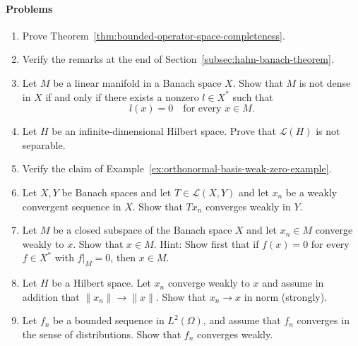 \paragraph*{Problems}

\begin{enumerate}[label=\thesection.\arabic*.,ref=\thesection.\arabic*,start=24,series=book-problems]

\item\label{ex:bounded-operator-space-completeness} Prove Theorem~\ref{thm:bounded-operator-space-completeness}.

\item\label{ex:hahn-banach-hilbert-extension-details} Verify the remarks at the end of Section~\ref{subsec:hahn-banach-theorem}.

\item\label{ex:nondense-linear-manifold-annihilating-functional} Let $M$ be a linear manifold in a Banach space $X$. Show that $M$ is not dense in $X$ if and only if there exists a nonzero $l\in X^*$ such that\[l(x)=0\quad\text{for every }x\in M.\]

\item\label{ex:infinite-hilbert-operator-space-nonseparable} Let $H$ be an infinite-dimensional Hilbert space. Prove that $\mathcal{L}(H)$ is not separable.

\item\label{ex:orthonormal-basis-weak-zero} Verify the claim of Example~\ref{ex:orthonormal-basis-weak-zero-example}.

\item\label{ex:bounded-linear-map-weak-continuity} Let $X,Y$ be Banach spaces and let $T\in\mathcal{L}(X,Y)$ and let $x_n$ be a weakly convergent sequence in $X$. Show that $Tx_n$ converges weakly in $Y$.

\item\label{ex:closed-linear-subspace-weak-sequential-closure} Let $M$ be a closed subspace of the Banach space $X$ and let $x_n\in M$ converge weakly to $x$. Show that $x\in M$. Hint: Show first that if $f(x)=0$ for every $f\in X^*$ with $f|_M=0$, then $x\in M$.

\item\label{ex:hilbert-weak-convergence-and-norms-imply-strong} Let $H$ be a Hilbert space. Let $x_n$ converge weakly to $x$ and assume in addition that $\|x_n\|\to\|x\|$. Show that $x_n\to x$ in norm (strongly).

\item\label{ex:bounded-l-two-distribution-limit-is-weak-limit} Let $f_n$ be a bounded sequence in $L^2(\Omega)$, and assume that $f_n$ converges in the sense of distributions. Show that $f_n$ converges weakly.


\end{enumerate}
